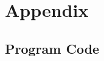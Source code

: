 \section{Appendix}

\listoflistings

\listoffigures

\listoftables

\subsection{Program Code}







